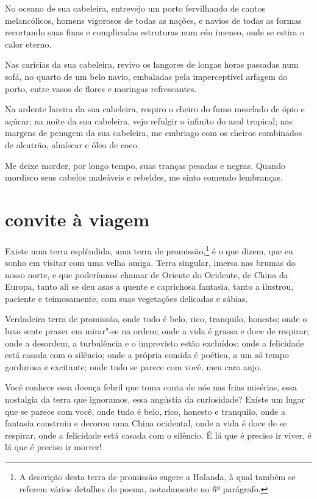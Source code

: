 No oceano de sua cabeleira, entrevejo um porto fervilhando de cantos
melancólicos, homens vigorosos de todas as nações, e navios de todas as
formas recortando suas finas e complicadas estruturas num céu imenso,
onde se estira o calor eterno.

Nas carícias da sua cabeleira, revivo os langores de longas horas
passadas num sofá, no quarto de um belo navio, embaladas pela
imperceptível arfagem do porto, entre vasos de flores e moringas
refrescantes.

Na ardente lareira da sua cabeleira, respiro o cheiro do fumo mesclado
de ópio e açúcar; na noite da sua cabeleira, vejo refulgir o infinito
do azul tropical; nas margens de penugem da sua cabeleira, me embriago
com os cheiros combinados de alcatrão, almíscar e óleo de coco.

Me deixe morder, por longo tempo, suas tranças pesadas e negras. Quando
mordisco seus cabelos maleáveis e rebeldes, me sinto comendo
lembranças.

\quebra\section[Convite à viagem]{convite à viagem}

Existe uma terra esplêndida, uma terra de promissão,\protect\footnote{ 
 A descrição desta terra de promissão sugere a Holanda, à qual também
se referem vários detalhes do poema, notadamente no 6º parágrafo.}
é o que dizem, que eu sonho em visitar com uma velha amiga. Terra
singular, imersa nas brumas do nosso norte, e que poderíamos chamar de
Oriente do Ocidente, de China da Europa, tanto ali se deu asas a
quente e caprichosa fantasia, tanto a ilustrou, paciente e
teimosamente, com suas vegetações delicadas e sábias.

Verdadeira terra de promissão, onde tudo é belo, rico, tranquilo,
honesto; onde o luxo sente prazer em mirar"-se na ordem; onde a vida é
grassa e doce de respirar; onde a desordem, a turbulência e o
imprevisto estão excluídos; onde a felicidade está casada com o
silêncio; onde a própria comida é poética, a um
só tempo gordurosa e excitante; onde tudo se parece com você, meu caro anjo.

Você conhece essa doença febril que toma conta de nós nas frias
misérias, essa nostalgia da terra que ignoramos, essa angústia da
curiosidade? Existe um lugar que se parece com você, onde tudo é
belo, rico, honesto e tranquilo, onde a fantasia construiu e decorou
uma China ocidental, onde a vida é doce de se respirar, onde a
felicidade está casada com o silêncio. É lá que é preciso ir viver, é
lá que é preciso ir morrer!

